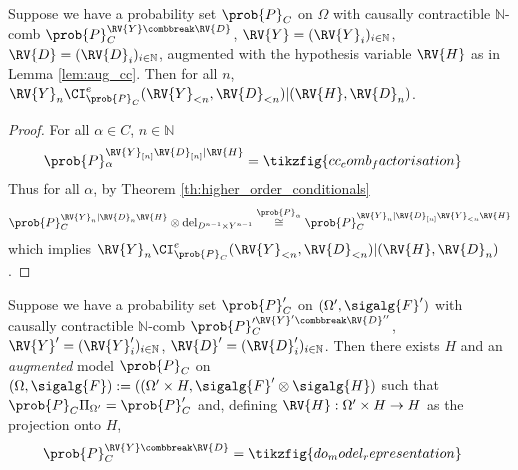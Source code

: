 












\begin{theorem}
Suppose we have a probability set $\prob{P}_C$ on $\Omega$ with causally contractible $\mathbb{N}$-comb $\prob{P}_C^{\RV{Y}\combbreak \RV{D}}$, $\RV{Y}=(\RV{Y}_i)_{i\in\mathbb{N}}$, $\RV{D}=(\RV{D}_i)_{i\in\mathbb{N}}$, augmented with the hypothesis variable $\RV{H}$ as in Lemma \ref{lem:aug_cc}. Then for all $n$, $\RV{Y}_n\CI^e_{\prob{P}_C}(\RV{Y}_{<n},\RV{D}_{<n})|(\RV{H},\RV{D}_n)$.
\end{theorem}

\begin{proof}
For all $\alpha\in C$, $n\in \mathbb{N}$
\begin{align}
	\prob{P}_\alpha^{\RV{Y}_{[n]}\RV{D}_{[n]}|\RV{H}} &= \tikzfig{cc_comb_factorisation}
\end{align}
Thus for all $\alpha$, by Theorem \ref{th:higher_order_conditionals}
\begin{align}
	\prob{P}_C^{\RV{Y}_n|\RV{D}_n\RV{H}}\otimes \mathrm{del}_{D^{n-1}\times Y^{n-1}} \overset{\prob{P}_\alpha}{\cong} \prob{P}_C^{\RV{Y}_n|\RV{D}_{[n]}\RV{Y}_{<n}\RV{H}}
\end{align}
which implies $\RV{Y}_n\CI^e_{\prob{P}_C}(\RV{Y}_{<n},\RV{D}_{<n})|(\RV{H},\RV{D}_n)$.
\end{proof}

\begin{lemma}\label{lem:aug_cc}
Suppose we have a probability set $\prob{P}_C'$ on $(\Omega',\sigalg{F}')$ with causally contractible $\mathbb{N}$-comb $\prob{P}_C^{\prime \RV{Y}'\combbreak \RV{D}''}$, $\RV{Y}'=(\RV{Y}'_i)_{i\in\mathbb{N}}$, $\RV{D}'=(\RV{D}'_i)_{i\in\mathbb{N}}$. Then there exists $H$ and an \emph{augmented} model $\prob{P}_C$ on $(\Omega,\sigalg{F}):=((\Omega'\times H,\sigalg{F}'\otimes\sigalg{H})$ such that $\prob{P}_C\Pi_{\Omega'}=\prob{P}_C'$ and, defining $\RV{H}:\Omega'\times H\to H$ as the projection onto $H$,
\begin{align}
    \prob{P}_C^{\RV{Y}\combbreak \RV{D}} &= \tikzfig{do_model_representation}\label{eq:do_model_rep}
\end{align}
\end{lemma}

